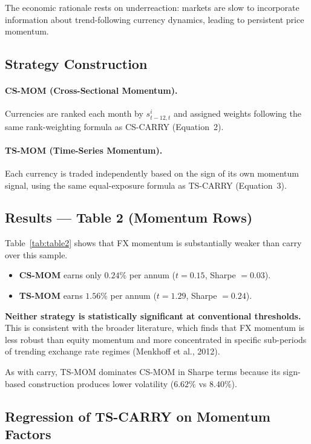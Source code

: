 \documentclass[a4paper,12pt]{article}
\begin{document}
The economic rationale rests on underreaction: markets are slow to incorporate information
about trend-following currency dynamics, leading to persistent price momentum.

\subsection{Strategy Construction}

\paragraph{CS-MOM (Cross-Sectional Momentum).}
Currencies are ranked each month by $s^i_{t-12,t}$ and assigned weights following the same
rank-weighting formula as CS-CARRY (Equation~2).

\paragraph{TS-MOM (Time-Series Momentum).}
Each currency is traded independently based on the sign of its own momentum signal, using
the same equal-exposure formula as TS-CARRY (Equation~3).

\subsection{Results --- Table 2 (Momentum Rows)}

Table~\ref{tab:table2} shows that FX momentum is substantially weaker than carry over this
sample.

\begin{itemize}
    \item \textbf{CS-MOM} earns only $0.24\%$ per annum ($t = 0.15$, Sharpe $= 0.03$).
    \item \textbf{TS-MOM} earns $1.56\%$ per annum ($t = 1.29$, Sharpe $= 0.24$).
\end{itemize}

\textbf{Neither strategy is statistically significant at conventional thresholds.} This is
consistent with the broader literature, which finds that FX momentum is less robust than
equity momentum and more concentrated in specific sub-periods of trending exchange rate
regimes (Menkhoff et al., 2012).

As with carry, TS-MOM dominates CS-MOM in Sharpe terms because its sign-based construction
produces lower volatility ($6.62\%$ vs $8.40\%$).

\subsection{Regression of TS-CARRY on Momentum Factors}
\end{document}
